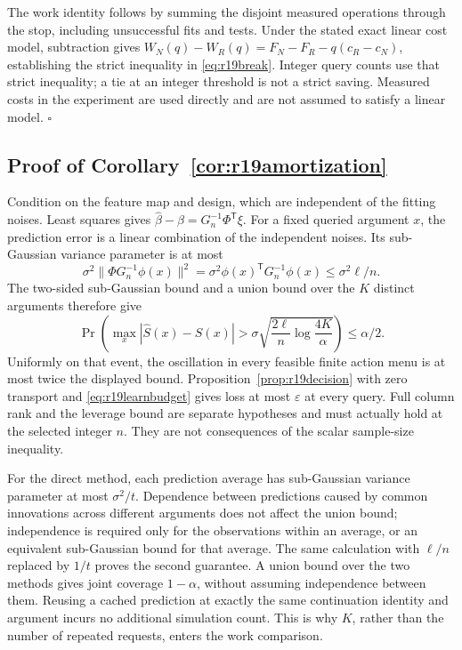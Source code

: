 The work identity follows by summing the disjoint measured operations through
the stop, including unsuccessful fits and tests. Under the stated exact
linear cost model, subtraction gives
$W_N(q)-W_R(q)=F_N-F_R-q(c_R-c_N)$, establishing the strict inequality
in \eqref{eq:r19break}. Integer query counts use that strict inequality;
a tie at an integer threshold is not a strict saving. Measured costs in the
experiment are used directly and are not assumed to satisfy a linear model.
\hfill$\square$

\subsection{Proof of Corollary~\ref{cor:r19amortization}}
Condition on the feature map and design, which are independent of the fitting
noises. Least squares gives
$\widehat\beta-\beta=G_n^{-1}\Phi^{\mathsf T}\xi$.
For a fixed queried argument $x$, the prediction error is a linear combination
of the independent noises. Its sub-Gaussian variance parameter is at most
\[
 \sigma^2\|\Phi G_n^{-1}\phi(x)\|^2
 =\sigma^2\phi(x)^{\mathsf T}G_n^{-1}\phi(x)
 \leq\sigma^2\ell/n.
\]
The two-sided sub-Gaussian bound and a union bound over the $K$ distinct
arguments therefore give
\[
 \Pr\left(\max_x|\widehat S(x)-S(x)|>
  \sigma\sqrt{\frac{2\ell}{n}\log\frac{4K}{\alpha}}\right)
 \leq\alpha/2.
\]
Uniformly on that event, the oscillation in every feasible finite action
menu is at most twice the displayed bound. Proposition~\ref{prop:r19decision}
with zero transport and \eqref{eq:r19learnbudget} gives loss at most
$\varepsilon$ at every query. Full column rank and the leverage bound are
separate hypotheses and must actually hold at the selected integer $n$.
They are not consequences of the scalar sample-size inequality.

For the direct method, each prediction average has sub-Gaussian variance
parameter at most $\sigma^2/t$. Dependence between predictions caused by
common innovations across different arguments does not affect the union
bound; independence is required only for the observations within an average,
or an equivalent sub-Gaussian bound for that average. The same calculation
with $\ell/n$ replaced by $1/t$ proves the second guarantee. A union bound
over the two methods gives joint coverage $1-\alpha$, without assuming
independence between them. Reusing a cached prediction at exactly the same
continuation identity and argument incurs no additional simulation count.
This is why $K$, rather than the number of repeated requests, enters the
work comparison.

